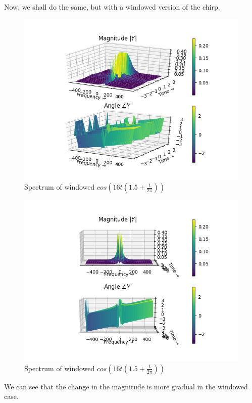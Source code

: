 \documentclass[11pt, a4paper, twoside]{article}
\begin{document}
    Now, we shall do the same, but with a windowed version of the chirp.
    \begin{figure}[H]
        \centering
        \includegraphics[scale=0.5]{Fig11.png}
        \caption{Spectrum of windowed $cos(16t(1.5 + \frac{t}{2\pi}))$}
        \label{fig:Fig6}
    \end{figure}
    \begin{figure}[H]
        \centering
        \includegraphics[scale=0.5]{Figure_11.png}
        \caption{Spectrum of windowed $cos(16t(1.5 + \frac{t}{2\pi}))$}
        \label{fig:Fig6}
    \end{figure}
    
    We can see that the change in the magnitude is more gradual in the windowed case.
\end{document}
